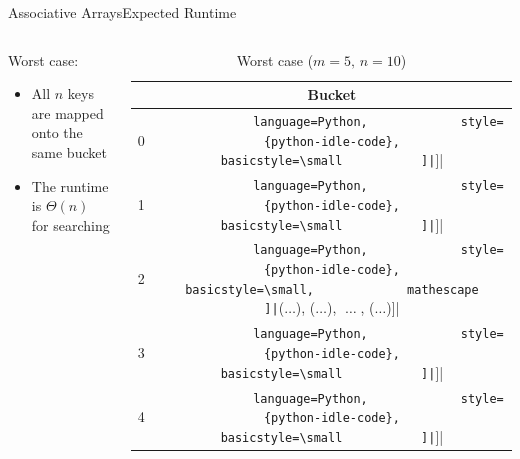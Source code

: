 
\begin{frame}{Associative Arrays}{Expected Runtime}
  \begin{columns}
    \begin{column}{0.5\linewidth}
      {\color{Mittel-Blau}Worst case}:
      \begin{itemize}
        \item
          All {\color{Mittel-Blau}$n$} keys are mapped onto the same bucket
        \item
          The runtime is {\color{Mittel-Blau}$\Theta(n)$} for searching
      \end{itemize}
    \end{column}
    \begin{column}{0.4\linewidth}
      \begin{table}[!h]
        \caption{Worst case ($m = 5, \, n = 10$)}
        \label{tab:hash_table:runtime_worst_case}
        \begin{tabularx}{\textwidth}{c|c}
          {} & Bucket\\
          \midrule
          0 & \lstinline[
            language=Python,
            style={python-idle-code},
            basicstyle=\small
          ]|[]|\\
          1 & \lstinline[
            language=Python,
            style={python-idle-code},
            basicstyle=\small
          ]|[]|\\
          2 & \lstinline[
            language=Python,
            style={python-idle-code},
            basicstyle=\small,
            mathescape
          ]|[($\ldots$), ($\ldots$), $\;\ldots\;$, ($\ldots$)]|\\
          3 & \lstinline[
            language=Python,
            style={python-idle-code},
            basicstyle=\small
          ]|[]|\\
          4 & \lstinline[
            language=Python,
            style={python-idle-code},
            basicstyle=\small
          ]|[]|
        \end{tabularx}
      \end{table}
    \end{column}
  \end{columns}
\end{frame}

